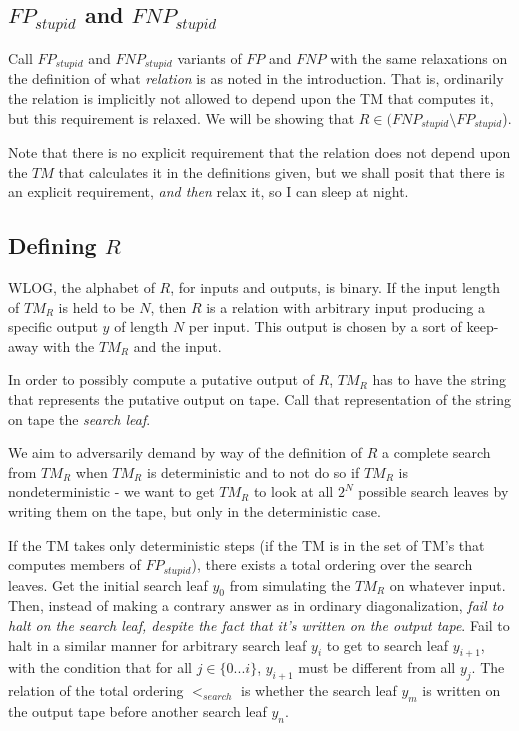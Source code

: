 \documentclass{article}
\begin{document}
\subsection{$FP_{stupid}$ and $FNP_{stupid}$}

Call $FP_{stupid}$ and $FNP_{stupid}$ variants of $FP$ and $FNP$ with the same relaxations on the definition of what \textit{relation} is as noted in the introduction. That is, ordinarily the relation is implicitly not allowed to depend upon the TM that computes it, but this requirement is relaxed. We will be showing that $R \in (FNP_{stupid} \setminus FP_{stupid}$).

Note that there is no explicit requirement that the relation does not depend upon the $TM$ that calculates it in the definitions given, but we shall posit that there is an explicit requirement, \textit{and then} relax it, so I can sleep at night.

\subsection{Defining $R$}

WLOG, the alphabet of $R$, for inputs and outputs, is binary. If the input length of $TM_R$ is held to be $N$, then $R$ is a relation with arbitrary input producing a specific output $y$ of length $N$ per input. This output is chosen by a sort of keep-away with the $TM_R$ and the input.

In order to possibly compute a putative output of $R$, $TM_R$ has to have the string that represents the putative output on tape. Call that representation of the string on tape the \textit{search leaf}.

We aim to adversarily demand by way of the definition of $R$ a complete search from $TM_R$ when $TM_R$ is deterministic and to not do so if $TM_R$ is nondeterministic - we want to get $TM_R$ to look at all $2^N$ possible search leaves by writing them on the tape, but only in the deterministic case.

If the TM takes only deterministic steps (if the TM is in the set of TM's that computes members of $FP_{stupid}$), there exists a total ordering over the search leaves. Get the initial search leaf $y_0$ from simulating the $TM_R$ on whatever input. Then, instead of making a contrary answer as in ordinary diagonalization, \textit{fail to halt on the search leaf, despite the fact that it's written on the output tape}. Fail to halt in a similar manner for arbitrary search leaf $y_i$ to get to search leaf $y_{i+1}$, with the condition that for all $j \in \{ 0 ... i \}$, $y_{i+1}$ must be different from all $y_j$. The relation of the total ordering $<_{search}$ is whether the search leaf $y_m$ is written on the output tape before another search leaf $y_n$.
\end{document}
